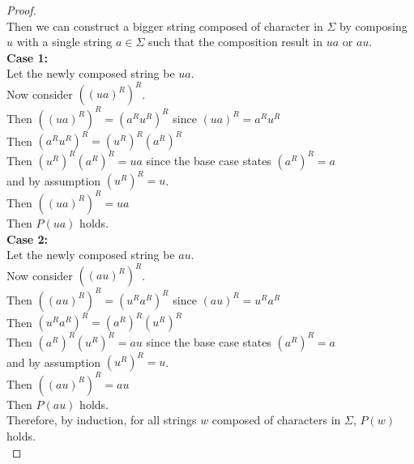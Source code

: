 \documentclass[12pt]{article}
\begin{document}
\begin{proof}
\\Then we can construct a bigger string composed of character in $\Sigma$ by composing $u$ with a single string $a\in\Sigma$ such that the composition result in $ua$ or $au$.
\\\indent \textbf{Case 1:}
\\\indent Let the newly composed string be $ua$.
\\\indent\indent Now consider ${({(ua)}^{R})}^{R}$.
\\\indent\indent Then ${({(ua)}^{R})}^{R} = {({a}^{R}{u}^{R})}^{R}$ since ${(ua)}^{R} = {a}^{R}{u}^{R}$
\\\indent\indent Then ${({a}^{R}{u}^{R})}^{R} = {({u}^{R})}^{R}{({a}^{R})}^{R}$
\\\indent\indent Then ${({u}^{R})}^{R}{({a}^{R})}^{R} = ua$ since the base case states ${({a}^{R})}^{R} = a$
\\\indent\indent and by assumption ${({u}^{R})}^{R} = u$.
\\\indent\indent Then ${({(ua)}^{R})}^{R} = ua$
\\\indent Then $P(ua)$ holds.
\\\indent \textbf{Case 2:}
\\\indent Let the newly composed string be $au$.
\\\indent\indent Now consider ${({(au)}^{R})}^{R}$.
\\\indent\indent Then ${({(au)}^{R})}^{R} = {({u}^{R}{a}^{R})}^{R}$ since ${(au)}^{R} = {u}^{R}{a}^{R}$
\\\indent\indent Then ${({u}^{R}{a}^{R})}^{R} = {({a}^{R})}^{R}{({u}^{R})}^{R}$
\\\indent\indent Then ${({a}^{R})}^{R}{({u}^{R})}^{R} = au$ since the base case states ${({a}^{R})}^{R} = a$
\\\indent\indent and by assumption ${({u}^{R})}^{R} = u$.
\\\indent\indent Then ${({(au)}^{R})}^{R} = au$
\\\indent Then $P(au)$ holds.
\\ Therefore, by induction, for all strings $w$ composed of characters in $\Sigma$, $P(w)$ holds.\\
\end{proof}

\end{document}
